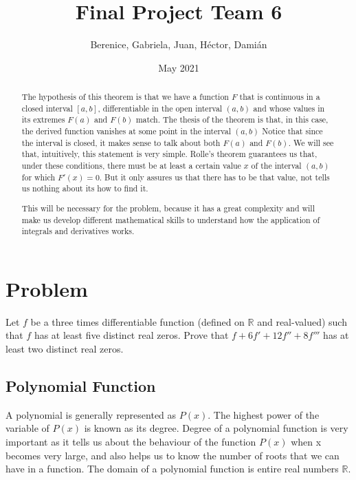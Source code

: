 \documentclass{article}
\title{Final Project Team 6}
\author{Berenice, Gabriela, Juan, Héctor, Damián}
\date{May 2021}
\begin{document}
    \maketitle
    \tableofcontents
    \newpage



    \begin{abstract}
        The hypothesis of this theorem is that we have a function $F$ that is continuous in a closed interval $[a, b]$, differentiable in the open interval $(a, b)$ and whose values in its extremes $F(a)$ and $F(b)$ match.
        The thesis of the theorem is that, in this case, the derived function vanishes at some point in the interval $(a, b)$
        Notice that since the interval is closed, it makes sense to talk about both $F(a)$ and $F(b)$. We will see that, intuitively, this statement is very simple.
        Rolle's theorem guarantees us that, under these conditions, there must be at least a certain value $x$ of the interval $(a, b)$ for which $F'(x) = 0$. But it only assures us that there has to be that value, not tells us nothing about its how to find it.

        This will be necessary for the problem, because it has a great complexity and will make us develop different mathematical skills to understand how the application of integrals and derivatives works.
    \end{abstract}

    \section{Problem}
    Let $f$ be a three times differentiable function (defined on $\mathbb{R}$
    and real-valued) such that $f$ has at least five distinct real zeros. 
    Prove that $f + 6f' + 12f'' + 8f'''$ has at least two distinct real zeros.
    

    \subsection{Polynomial Function}
    A polynomial is generally represented as $P(x)$. The highest power of the variable of $P(x)$ is known as its degree. Degree of a polynomial function is very important as it tells us about the behaviour of the function $P(x)$ when x becomes very large, and also helps us to know the number of roots that we can have in a function. The domain of a polynomial function is entire real numbers $\mathbb{R} $.
\end{document}

